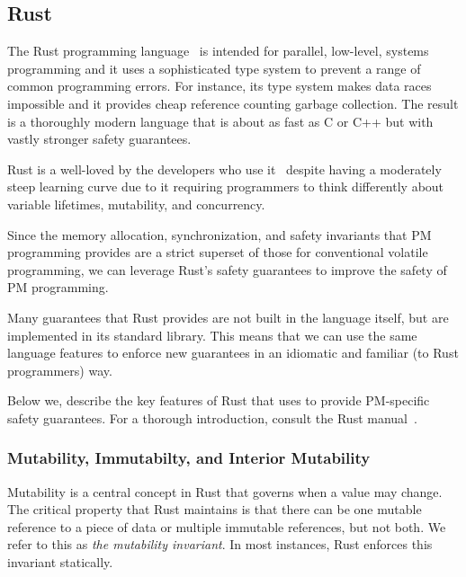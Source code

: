 \subsection{Rust}
\label{sec:rust}

The Rust programming language~\cite{rustbook} is intended for parallel,
low-level, systems programming and it uses a sophisticated type system to
prevent a range of common programming errors.  For instance, its type system 
makes data races impossible and it provides cheap reference counting garbage collection.
The result is a thoroughly modern language that is about as fast
as C or C++ but with vastly stronger safety guarantees.

Rust is a well-loved by the developers who use it~\cite{mostloved} despite having
a moderately steep learning curve due to it requiring
programmers to think differently about variable lifetimes, mutability, and
concurrency.

Since the memory allocation, synchronization, and safety invariants that PM
programming provides are a strict superset of those for conventional volatile
programming, we can leverage Rust's safety guarantees to improve the safety of
PM programming.

Many guarantees that Rust provides are not built in the
language itself, but are implemented in its standard library.  This means that
we can use the same language features to enforce new guarantees in an idiomatic
and familiar (to Rust programmers) way.

Below we, describe the key features of Rust that \this{} uses to provide
PM-specific safety guarantees.  For a thorough introduction, consult the Rust manual~\cite{rustbook}.

\subsubsection{Mutability, Immutabilty, and Interior Mutability}

Mutability is a central concept in Rust that governs when a value may change.
The critical property that Rust maintains is that there can be one mutable
reference to a piece of data or multiple immutable references, but not both.
We refer to this as \emph{the mutability invariant}.  In most instances, Rust
enforces this invariant statically.


